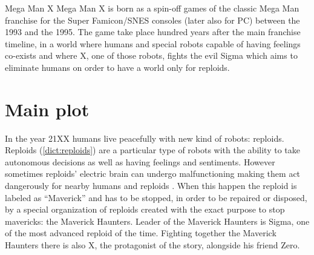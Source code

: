 \documentclass[openany]{report}
\begin{document}
\begin{chapter}{Mega Man X}
	Mega Man X is born as a spin-off games of the classic Mega Man franchise for the Super Famicon/SNES consoles (later also for PC)  between the 1993 and the 1995\cite{wiki:MMX}. The game take place hundred years after the main franchise timeline, in a world where humans and special robots capable of having feelings co-exists and where X, one of those robots, fights the evil Sigma which aims to eliminate humans on order to have a world only for reploids.
	\section[Main plot]{Main plot }
	In the year 21XX humans live peacefully with new kind of robots: reploids. Reploids (\ref{dict:reploids}) are a particular type of robots with the ability to take autonomous decisions as well as having feelings and sentiments\cite{Xcoll1:Manual_1}. However sometimes reploids' electric brain can undergo  malfunctioning making them act dangerously for nearby humans and reploids . When this happen the reploid is labeled as ``Maverick'' and has to be stopped, in order to be repaired or disposed, by a special organization of reploids created with the exact purpose to stop mavericks: the Maverick Haunters. Leader of the Maverick Haunters is Sigma, one of the most advanced reploid of the time. Fighting together the Maverick Haunters there is also X, the protagonist of the story, alongside his friend Zero. 
	

\end{chapter}
\end{document}
